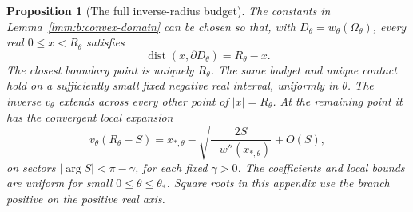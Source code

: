 \documentclass[a4paper,10pt]{article}
\numberwithin{equation}{section}
\theoremstyle{paperplain}
\newtheorem{prp}[thm]{Proposition}
\theoremstyle{paperremark}
\theoremstyle{paperplain}
\begin{document}
\begin{prp}[The full inverse-radius budget]\label{prp:b:inverse-budget}
The constants in Lemma~\ref{lmm:b:convex-domain} can be chosen so that,
with $D_\theta=w_\theta(\Omega_\theta)$, every real
$0\leq x<R_\theta$ satisfies
\begin{equation}\label{eq:b:inverse-budget}
 \operatorname{dist}(x,\partial D_\theta)=R_\theta-x.
\end{equation}
The closest boundary point is uniquely $R_\theta$. The same budget
and unique contact hold on a sufficiently small fixed negative real
interval, uniformly in $\theta$. The inverse
$v_\theta$ extends across every other point of $|x|=R_\theta$.
At the remaining point it has the convergent local expansion
\begin{equation}\label{eq:b:morse-inverse}
 v_\theta(R_\theta-S)
 =x_{*,\theta}
       -\sqrt{\frac{2S}{-w''(x_{*,\theta})}}+O(S),
\end{equation}
on sectors $|\arg S|<\pi-\gamma$, for each fixed $\gamma>0$.
The coefficients and local bounds are uniform for small
$0\leq\theta\leq\theta_*$. Square roots in this appendix use the
branch positive on the positive real axis.
\end{prp}
\end{document}
